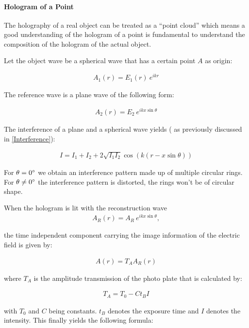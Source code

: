 \paragraph{Hologram of a Point}

The holography of a real object can be treated as a ``point cloud'' which means a good understanding of the hologram of a point is fundamental to understand the composition of the hologram of the actual object. 

Let the object wave be a spherical wave that has a certain point $A$ as origin:


\begin{align}
A_1(r)=E_1(r) \ e^{ikr}
\end{align}


The reference wave is a plane wave of the following form:

\begin{align}
A_2(r)=E_2\ e^{ikx \sin\theta} 
\end{align}


The interference of a plane and a spherical wave yields ( as previously discussed in \ref{Interference}):

\begin{align}
I=I_1+I_2+2\sqrt{I_1I_2}\cos(k(r-x\sin\theta))
\end{align}



For $\theta=0^\circ$ we obtain an interference pattern made up of multiple circular rings. For  $\theta\neq0^\circ$ the interference pattern is distorted, the rings won't be of circular shape.



When the hologram is lit with the reconstruction wave
\begin{align}
A_R(r)=A_R\ e^{ikx \sin\theta},
\end{align}


the time independent component carrying the image information of the electric field is given by:


\begin{align}
A(r)=T_AA_R(r)
\end{align}


where $T_A$ is the amplitude transmission of the photo plate that is calculated by:


\begin{align}
T_A=T_0-Ct_BI
\end{align}


with
$T_0$ and $C$ being constants. $t_B$ denotes the exposure time and $I$ denotes the intensity.
This finally yields the following formula:

